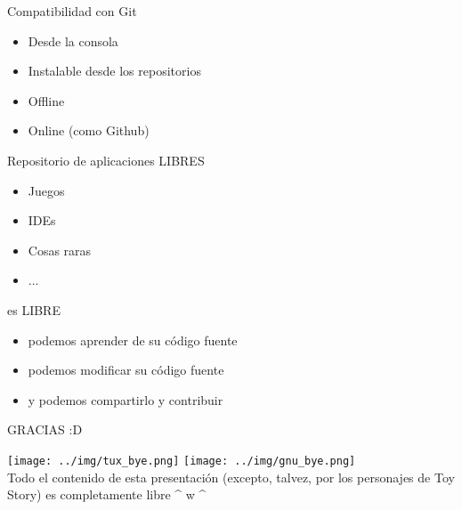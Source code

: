 \documentclass[xcolor=dvipsnames, pdf]{beamer}
\begin{document}
\begin{section}
\begin{subsection}
    \begin{frame}
      {Compatibilidad con Git}
      
      \begin{itemize}
      \item Desde la consola
      \item Instalable desde los repositorios
      \item Offline
      \item Online (como Github)
      \end{itemize}
    \end{frame}
    
    \begin{frame}
      {Repositorio de aplicaciones LIBRES}
      \begin{itemize}
      \item Juegos
      \item IDEs
      \item Cosas raras
      \item ...
      \end{itemize}  
    \end{frame}
    
    \begin{frame}
      {es LIBRE}
      
      \begin{itemize}
      \item podemos \alert{aprender} de su código fuente
      \item podemos \alert{modificar} su código fuente
      \item y podemos \alert{compartirlo y contribuir}
      \end{itemize}
    \end{frame}
    
  \end{subsection}
\end{section}

\begin{section}
  {}
  \begin{frame}[clean]
    {GRACIAS :D}
    \begin{center}
      \texttt{[image: ../img/tux\_bye.png]}
      \hfill \texttt{[image: ../img/gnu\_bye.png]}
      \\Todo el contenido de esta presentación (excepto, talvez, por los
      personajes de Toy Story) es completamente libre \^{} w \^{}
    \end{center}
  \end{frame}    
\end{section}
\end{document}
